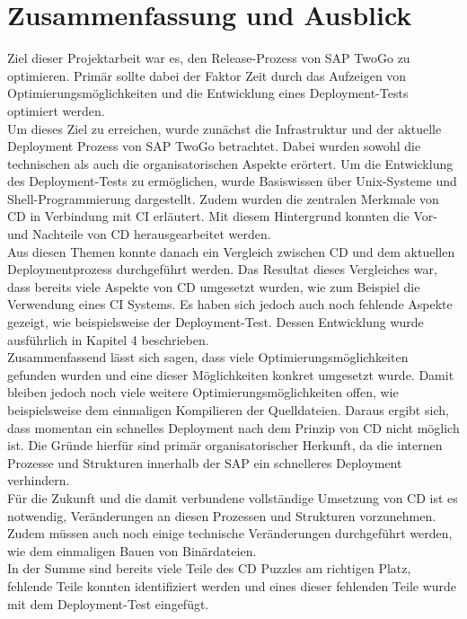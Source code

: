 
\chapter{Zusammenfassung und Ausblick}
Ziel dieser Projektarbeit war es, den Release-Prozess von SAP TwoGo zu optimieren. Primär sollte dabei der Faktor Zeit durch das Aufzeigen von Optimierungsmöglichkeiten und die Entwicklung eines Deployment-Tests optimiert werden. \\
Um dieses Ziel zu erreichen, wurde zunächst die Infrastruktur und der aktuelle Deployment Prozess von SAP TwoGo betrachtet. Dabei wurden sowohl die technischen als auch die organisatorischen Aspekte erörtert. Um die Entwicklung des Deployment-Tests zu ermöglichen, wurde Basiswissen über Unix-Systeme und Shell-Programmierung dargestellt. Zudem wurden die zentralen Merkmale von \acs{CD} in Verbindung mit \acs{CI} erläutert. Mit diesem Hintergrund konnten die Vor- und Nachteile von \acs{CD} herausgearbeitet werden.\\
Aus diesen Themen konnte danach ein Vergleich zwischen \acs{CD} und dem aktuellen Deploymentprozess durchgeführt werden. Das Resultat dieses Vergleiches war, dass bereits viele Aspekte von \acs{CD} umgesetzt wurden, wie zum Beispiel die Verwendung eines \acs{CI} Systems. Es haben sich jedoch auch noch fehlende Aspekte gezeigt, wie beispielsweise der Deployment-Test. Dessen Entwicklung wurde ausführlich in Kapitel 4 beschrieben.\\
Zusammenfassend lässt sich  sagen, dass viele Optimierungsmöglichkeiten gefunden wurden und eine dieser Möglichkeiten konkret umgesetzt wurde. Damit bleiben jedoch noch viele weitere Optimierungsmöglichkeiten offen, wie beispielsweise dem einmaligen Kompilieren der Quelldateien. Daraus ergibt sich, dass momentan ein schnelles Deployment nach dem Prinzip von \acs{CD} nicht möglich ist. Die Gründe hierfür sind primär organisatorischer Herkunft, da die internen Prozesse und Strukturen innerhalb der SAP ein schnelleres Deployment verhindern.\\
Für die Zukunft und die damit verbundene vollständige Umsetzung von \acs{CD} ist es notwendig, Veränderungen an diesen Prozessen und Strukturen vorzunehmen. Zudem müssen auch noch einige technische Veränderungen durchgeführt werden, wie dem einmaligen Bauen von Binärdateien.\\
In der Summe sind bereits viele Teile des \acs{CD} Puzzles am richtigen Platz, fehlende Teile konnten identifiziert werden und eines dieser fehlenden Teile wurde mit dem Deployment-Test eingefügt.
